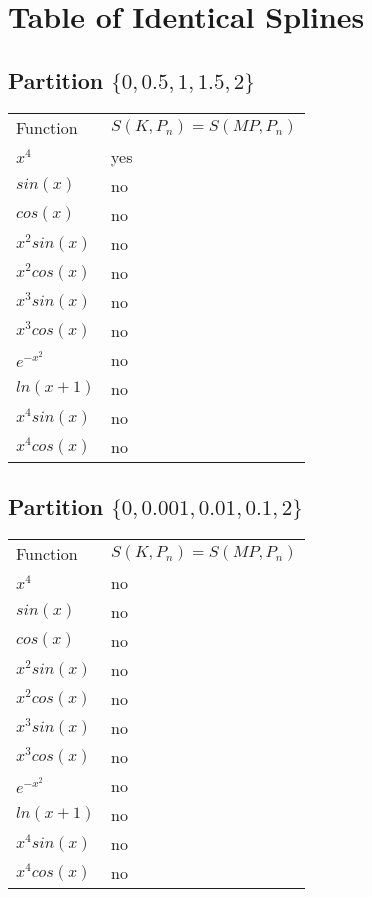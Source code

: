 

%
\chapter*{\thechapter \quad Table of Identical Splines}
\label{appendixG}

\section{Partition $\{0,0.5,1,1.5,2\}$}
\small{\begin{tabular}{ll}
Function    & $S(K,P_{n})=S(MP,P_{n})$ \\
$x^4$       & yes                      \\
$sin(x)$    & no                       \\
$cos(x)$    & no                       \\
$x^2sin(x)$ & no                       \\
$x^2cos(x)$ & no                       \\
$x^3sin(x)$ & no                       \\
$x^3cos(x)$ & no                       \\
$e^{-x^2}$  & no                       \\
$ln(x+1)$   & no                       \\
$x^4sin(x)$ & no                       \\
$x^4cos(x)$ & no                      
\end{tabular}}

\section{Partition $\{0,0.001,0.01,0.1,2\}$}
\small{\begin{tabular}{ll}
Function    & $S(K,P_{n})=S(MP,P_{n})$ \\
$x^4$       & no                      \\
$sin(x)$    & no                       \\
$cos(x)$    & no                       \\
$x^2sin(x)$ & no                       \\
$x^2cos(x)$ & no                       \\
$x^3sin(x)$ & no                       \\
$x^3cos(x)$ & no                       \\
$e^{-x^2}$  & no                       \\
$ln(x+1)$   & no                       \\
$x^4sin(x)$ & no                       \\
$x^4cos(x)$ & no                      
\end{tabular}}